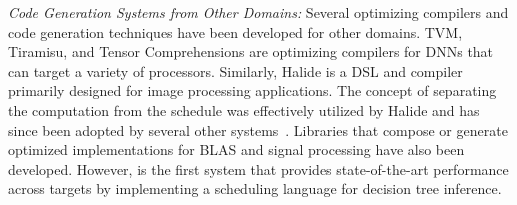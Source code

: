 \emph{Code Generation Systems from Other Domains:}
Several optimizing compilers and code generation techniques have been developed 
for other domains. TVM\cite{TVM}, Tiramisu\cite{Tiramisu}, and Tensor 
Comprehensions\cite{TensorComprehensions} are optimizing compilers 
for DNNs that can target a variety of processors. Similarly, 
Halide\cite{Halide} is a DSL and compiler primarily designed for 
image processing applications. The concept of separating the computation 
from the schedule was effectively utilized by Halide and has since been adopted 
by several other systems~\cite{TVM,Tiramisu,GraphIt}. 
Libraries that compose or generate optimized implementations  
for BLAS\cite{BLIS, atlas_sc98, CUTLASS} and signal processing\cite{FFTW, SPIRAL}
have also been developed.
However, \Treebeard{} is the first system that provides state-of-the-art performance
across targets by implementing a scheduling language for decision tree inference.

